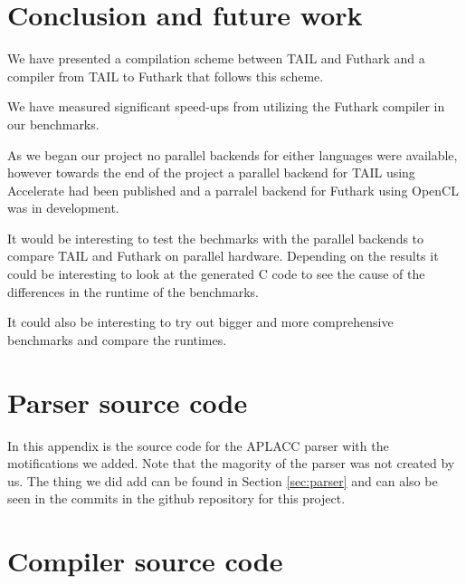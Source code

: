 \documentclass[11pt]{article}
\begin{document}

\section{Conclusion and future work}

We have presented a compilation scheme between TAIL and Futhark and a compiler from TAIL to Futhark that follows this scheme. 

We have measured significant speed-ups from utilizing the Futhark compiler in our benchmarks.

As we began our project no parallel backends for either languages were available, however towards the end of the project a
parallel backend for TAIL using Accelerate had been published \cite{Array:2015} and a parralel backend for Futhark using OpenCL
was in development.

It would be interesting to test the bechmarks with the parallel backends to compare TAIL and Futhark on parallel hardware.
Depending on the results it could be interesting to look at the generated C code to see the cause of the differences in the
runtime of the benchmarks.

It could also be interesting to try out bigger and more comprehensive benchmarks and compare the runtimes.
{} 


\appendix
\section{Parser source code}
\label{app:parser}

In this appendix is the source code for the APLACC parser \cite{APLACC} with the motifications we added. Note that the magority of the parser was not created by us. The thing we did add can be found in Section \ref{sec:parser} and can also be seen in the commits in the github repository for this project. 

\lstset{breaklines=true}



\section{Compiler source code}
\label{app:impl}
\end{document}
